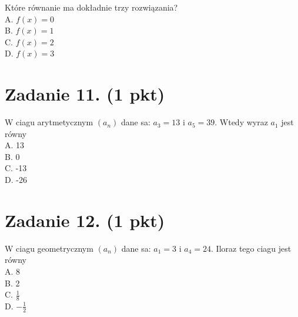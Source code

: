 \documentclass[10pt]{article}
\begin{document}
Które równanie ma dokładnie trzy rozwiązania?\\
A. \(f(x)=0\)\\
B. \(f(x)=1\)\\
C. \(f(x)=2\)\\
D. \(f(x)=3\)

\section*{Zadanie 11. (1 pkt)}
W ciagu arytmetycznym \(\left(a_{n}\right)\) dane sa: \(a_{3}=13\) i \(a_{5}=39\). Wtedy wyraz \(a_{1}\) jest równy\\
A. 13\\
B. 0\\
C. -13\\
D. -26

\section*{Zadanie 12. (1 pkt)}
W ciagu geometrycznym \(\left(a_{n}\right)\) dane sa: \(a_{1}=3\) i \(a_{4}=24\). Iloraz tego ciagu jest równy\\
A. 8\\
B. 2\\
C. \(\frac{1}{8}\)\\
D. \(-\frac{1}{2}\)
\end{document}
